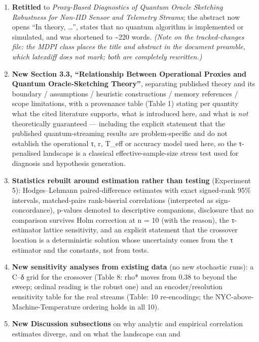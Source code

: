 \documentclass[
  11pt,
]{article}
\providecommand{\tightlist}{%
  \setlength{\itemsep}{0pt}\setlength{\parskip}{0pt}}
\begin{document}
\begin{enumerate}
\def\labelenumi{\arabic{enumi}.}
\tightlist
\item
  \textbf{Retitled} to \emph{Proxy-Based Diagnostics of Quantum Oracle
  Sketching Robustness for Non-IID Sensor and Telemetry Streams}; the
  abstract now opens ``In theory, \ldots{}'', states that no quantum
  algorithm is implemented or simulated, and was shortened to
  \textasciitilde220 words. \emph{(Note on the tracked-changes file: the
  MDPI class places the title and abstract in the document preamble,
  which latexdiff does not mark; both are completely rewritten.)}
\item
  \textbf{New Section 3.3, ``Relationship Between Operational Proxies
  and Quantum Oracle-Sketching Theory''}, separating published theory
  and its boundary / assumptions / heuristic constructions / memory
  references / scope limitations, with a provenance table (Table 1)
  stating per quantity what the cited literature supports, what is
  introduced here, and what is \emph{not} theoretically guaranteed ---
  including the explicit statement that the published quantum-streaming
  results are problem-specific and do not establish the operational τ,
  r, T\_eff or accuracy model used here, so the τ-penalised landscape is
  a classical effective-sample-size stress test used for diagnosis and
  hypothesis generation.
\item
  \textbf{Statistics rebuilt around estimation rather than testing}
  (Experiment 5): Hodges--Lehmann paired-difference estimates with exact
  signed-rank 95\% intervals, matched-pairs rank-biserial correlations
  (interpreted as sign-concordance), p-values demoted to descriptive
  companions, disclosure that no comparison survives Holm correction at
  n = 10 (with the reason), the τ-estimator lattice sensitivity, and an
  explicit statement that the crossover location is a deterministic
  solution whose uncertainty comes from the τ estimator and the
  constants, not from tests.
\item
  \textbf{New sensitivity analyses from existing data} (no new
  stochastic runs): a C--δ grid for the crossover (Table 8: rho* moves
  from 0.38 to beyond the sweep; ordinal reading is the robust one) and
  an encoder/resolution sensitivity table for the real streams (Table:
  10 re-encodings; the NYC-above-Machine-Temperature ordering holds in
  all 10).
\item
  \textbf{New Discussion subsections} on why analytic and empirical
  correlation estimates diverge, and on what the landscape can and

\end{enumerate}
\end{document}
